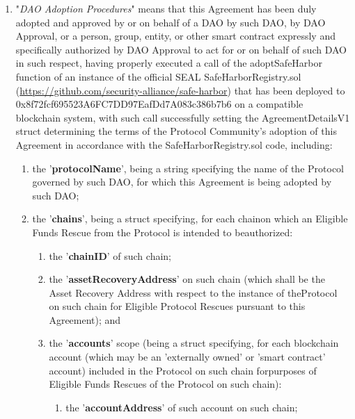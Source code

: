 \documentclass{article}
\begin{document}
\begin{enumerate}[label=\Alph*.]
\begin{enumerate}
\begin{enumerate}
                    \end{enumerate}
          \end{enumerate}

    \item "\textit{DAO Adoption Procedures}" means that this Agreement has been duly adopted and approved by or on behalf of a DAO by such DAO, by DAO Approval, or a person, group, entity, or other smart contract expressly and specifically authorized by DAO Approval to act for or on behalf of such DAO in such respect, having properly executed a call of the adoptSafeHarbor function of an instance of the official SEAL SafeHarborRegistry.sol (\url{https://github.com/security-alliance/safe-harbor}) that has been deployed to 0x8f72fcf695523A6FC7DD97EafDd7A083c386b7b6 on a compatible blockchain system, with such call successfully setting the AgreementDetailsV1 struct determining the terms of the Protocol Community's adoption of this Agreement in accordance with the SafeHarborRegistry.sol code, including:

          \begin{enumerate}
              \item the '\textbf{protocolName}', being a string specifying the name of the Protocol governed by such DAO, for which this Agreement is being adopted by such DAO;

              \item the '\textbf{chains}', being a struct specifying, for each chainon which an Eligible Funds Rescue from the Protocol is intended to beauthorized:

                    \begin{enumerate}
                        \item the '\textbf{chainID}' of such chain;

                        \item the '\textbf{assetRecoveryAddress}' on such chain (which shall be the Asset Recovery Address with respect to the instance of theProtocol on such chain for Eligible Protocol Rescues pursuant to this Agreement); and

                        \item the '\textbf{accounts}' scope (being a struct specifying, for each blockchain account (which may be an 'externally owned' or 'smart contract' account) included in the Protocol on such chain forpurposes of Eligible Funds Rescues of the Protocol on such chain):

                              \begin{enumerate}
                                  \item the '\textbf{accountAddress}' of such account on such chain;


\end{enumerate}
\end{enumerate}
\end{enumerate}
\end{enumerate}
\end{document}
